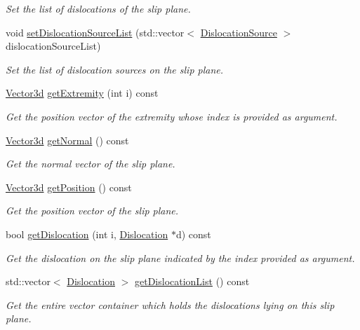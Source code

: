 \begin{DoxyCompactItemize}
\begin{DoxyCompactList}\small\item\em Set the list of dislocations of the slip plane. \end{DoxyCompactList}\item 
void \hyperlink{classSlipPlane_a6f520005b3c7e8c93df0b893201cea29}{set\-Dislocation\-Source\-List} (std\-::vector$<$ \hyperlink{classDislocationSource}{Dislocation\-Source} $>$ dislocation\-Source\-List)
\begin{DoxyCompactList}\small\item\em Set the list of dislocation sources on the slip plane. \end{DoxyCompactList}\item 
\hyperlink{classVector3d}{Vector3d} \hyperlink{classSlipPlane_a1df9437ef558f9dc7ec9fba62371e5e4}{get\-Extremity} (int i) const 
\begin{DoxyCompactList}\small\item\em Get the position vector of the extremity whose index is provided as argument. \end{DoxyCompactList}\item 
\hyperlink{classVector3d}{Vector3d} \hyperlink{classSlipPlane_a2b8043348d0b48318c0f3b6b9a43b5bc}{get\-Normal} () const 
\begin{DoxyCompactList}\small\item\em Get the normal vector of the slip plane. \end{DoxyCompactList}\item 
\hyperlink{classVector3d}{Vector3d} \hyperlink{classSlipPlane_a7ff7aec8b12e5711b3e01448a558200c}{get\-Position} () const 
\begin{DoxyCompactList}\small\item\em Get the position vector of the slip plane. \end{DoxyCompactList}\item 
bool \hyperlink{classSlipPlane_ae1c9a31425cacb758a10353d7b3cbc35}{get\-Dislocation} (int i, \hyperlink{classDislocation}{Dislocation} $\ast$d) const 
\begin{DoxyCompactList}\small\item\em Get the dislocation on the slip plane indicated by the index provided as argument. \end{DoxyCompactList}\item 
std\-::vector$<$ \hyperlink{classDislocation}{Dislocation} $>$ \hyperlink{classSlipPlane_a16b894e5cecbd0e11f050c287de22b8d}{get\-Dislocation\-List} () const 
\begin{DoxyCompactList}\small\item\em Get the entire vector container which holds the dislocations lying on this slip plane. \end{DoxyCompactList}\item 

\end{DoxyCompactItemize}

